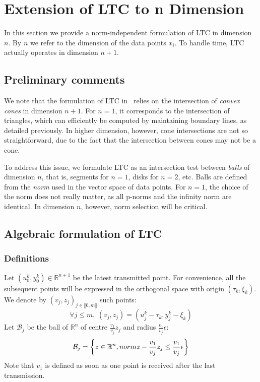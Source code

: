 \chapter{Extension of LTC to n Dimension}
In this section we provide a norm-independent formulation of LTC in
dimension $n$. By $n$ we refer to the dimension of the data points
$x_i$. To handle time, LTC actually operates in dimension
$n+1$.

\section{Preliminary comments}

We note that the formulation of LTC 
in~\cite{schoellhammer2004lightweight} relies on the intersection of 
\emph{convex cones} in dimension $n+1$. For $n=1$, it corresponds to 
the intersection of triangles, which can efficiently be computed by 
maintaining boundary lines, as detailed previously. In higher 
dimension, however, cone intersections are not so straightforward, due 
to the fact that the intersection between cones may not be a cone.

To address this issue, we formulate LTC as an intersection test between
\emph{balls} of dimension $n$, that is, segments for $n=1$, disks for
$n=2$, etc. Balls are defined from the \emph{norm} used in
the vector space of data points. For $n=1$, the choice of the norm does
not really matter, as all p-norms and the infinity norm are identical.
In dimension $n$, however, norm selection will be critical.

\section{Algebraic formulation of LTC}

\subsection{Definitions}

Let $(u_0^k, y_0^k) \in \mathbb{R}^{n+1}$ be the latest transmitted point. For convenience, all the subsequent points will be
expressed in the orthogonal space with origin $(\tau_k, \xi_k)$. We denote by $(v_j, z_j)_{j \in \llbracket 0, m \rrbracket}$ such points:
\begin{equation*}
\forall j \leq m,\  (v_j, z_j) = (u_j^k - \tau_k, y_j^k - \xi_k)
\end{equation*}
Let $\mathcal{B}_j$ be the ball of $\mathbb{R}^n$ of centre $\frac{v_1}{v_j}z_j$ and radius
$\frac{v_1}{v_j}\epsilon$:
\begin{equation*}
\mathcal{B}_j = \left\{ z \in \mathbb{R}^n,\\norm{z-\frac{v_1}{v_j}z_j} \leq\frac{v_1}{v_j}\epsilon \right\}
\end{equation*}
Note that $v_1$ is defined as soon as one point is received after the last
transmission.

